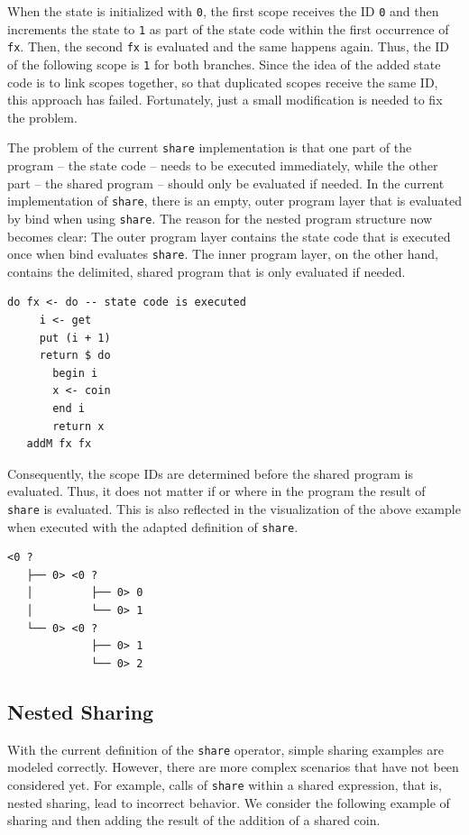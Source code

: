 \documentclass[a4paper, 11pt, fleqn, twoside, abstract=on]{scrreprt}
\newcommand{\hinl}[1]{\texttt{#1}}
\begin{document}
When the state is initialized with \hinl{0}, the first scope receives the ID \hinl{0} and then increments the state to \hinl{1} as part of the state code within the first occurrence of \hinl{fx}.
Then, the second \hinl{fx} is evaluated and the same happens again.
Thus, the ID of the following scope is \hinl{1} for both branches.%
Since the idea of the added state code is to link scopes together, so that duplicated scopes receive the same ID, this approach has failed.
Fortunately, just a small modification is needed to fix the problem.

The problem of the current \hinl{share} implementation is that one part of the program -- the state code -- needs to be executed immediately, while the other part -- the shared program -- should only be evaluated if needed.
In the current implementation of \hinl{share}, there is an empty, outer program layer that is evaluated by bind when using \hinl{share}.
The reason for the nested program structure now becomes clear: The outer program layer contains the state code that is executed once when bind evaluates \hinl{share}.
The inner program layer, on the other hand, contains the delimited, shared program that is only evaluated if needed.

\begin{verbatim}
do fx <- do -- state code is executed
     i <- get
     put (i + 1)
     return $ do
       begin i
       x <- coin
       end i
       return x
   addM fx fx
\end{verbatim}
\noindent
Consequently, the scope IDs are determined before the shared program is evaluated.
Thus, it does not matter if or where in the program the result of \hinl{share} is evaluated.
This is also reflected in the visualization of the above example when executed with the adapted definition of \hinl{share}.

\begin{verbatim}
<0 ? 
   ├── 0> <0 ? 
   │         ├── 0> 0
   │         └── 0> 1
   └── 0> <0 ? 
             ├── 0> 1
             └── 0> 2
\end{verbatim}

\subsection{Nested Sharing}
With the current definition of the \hinl{share} operator, simple sharing examples are modeled correctly.
However, there are more complex scenarios that have not been considered yet.
For example, calls of \hinl{share} within a shared expression, that is, nested sharing, lead to incorrect behavior.
We consider the following example of sharing and then adding the result of the addition of a shared coin.
\end{document}
